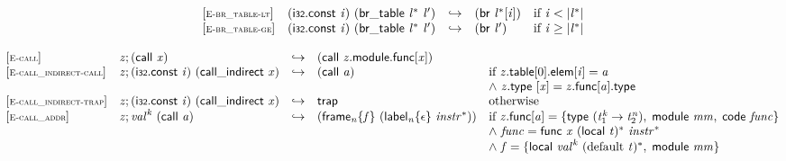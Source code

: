 \vspace{1ex}

$$
\begin{array}{@{}l@{}lcl@{}l@{}}
{[\textsc{\scriptsize E{-}br\_table{-}lt}]} \quad & (\mathsf{i{\scriptstyle32}}.\mathsf{const}~{\mathit{i}})~(\mathsf{br\_table}~{{\mathit{l}}^\ast}~{\mathit{l}'}) &\hookrightarrow& (\mathsf{br}~{{\mathit{l}}^\ast}{}[{\mathit{i}}]) &\quad
  \mbox{if}~{\mathit{i}} < {|{{\mathit{l}}^\ast}|} \\
{[\textsc{\scriptsize E{-}br\_table{-}ge}]} \quad & (\mathsf{i{\scriptstyle32}}.\mathsf{const}~{\mathit{i}})~(\mathsf{br\_table}~{{\mathit{l}}^\ast}~{\mathit{l}'}) &\hookrightarrow& (\mathsf{br}~{\mathit{l}'}) &\quad
  \mbox{if}~{\mathit{i}} \geq {|{{\mathit{l}}^\ast}|} \\
\end{array}
$$

\vspace{1ex}

$$
\begin{array}{@{}l@{}lcl@{}l@{}}
{[\textsc{\scriptsize E{-}call}]} \quad & {\mathit{z}} ; (\mathsf{call}~{\mathit{x}}) &\hookrightarrow& (\mathsf{call}~{\mathit{z}}.\mathsf{module}.\mathsf{func}{}[{\mathit{x}}]) &  \\
{[\textsc{\scriptsize E{-}call\_indirect{-}call}]} \quad & {\mathit{z}} ; (\mathsf{i{\scriptstyle32}}.\mathsf{const}~{\mathit{i}})~(\mathsf{call\_indirect}~{\mathit{x}}) &\hookrightarrow& (\mathsf{call}~{\mathit{a}}) &\quad
  \mbox{if}~{{\mathit{z}}.\mathsf{table}}{{}[0]}.\mathsf{elem}{}[{\mathit{i}}] = {\mathit{a}} \\
 &&&&\quad {\land}~{\mathit{z}}.\mathsf{type}~{}[{\mathit{x}}] = {\mathit{z}}.\mathsf{func}{}[{\mathit{a}}].\mathsf{type} \\
{[\textsc{\scriptsize E{-}call\_indirect{-}trap}]} \quad & {\mathit{z}} ; (\mathsf{i{\scriptstyle32}}.\mathsf{const}~{\mathit{i}})~(\mathsf{call\_indirect}~{\mathit{x}}) &\hookrightarrow& \mathsf{trap} &\quad
  \mbox{otherwise} \\
{[\textsc{\scriptsize E{-}call\_addr}]} \quad & {\mathit{z}} ; {{\mathit{val}}^{{\mathit{k}}}}~(\mathsf{call}~{\mathit{a}}) &\hookrightarrow& ({{\mathsf{frame}}_{{\mathit{n}}}}{\{{\mathit{f}}\}}~({{\mathsf{label}}_{{\mathit{n}}}}{\{\epsilon\}}~{{\mathit{instr}}^\ast})) &\quad
  \mbox{if}~{\mathit{z}}.\mathsf{func}{}[{\mathit{a}}] = \{ \begin{array}[t]{@{}l@{}}
\mathsf{type}~({{\mathit{t}}_{{1}}^{{\mathit{k}}}} \rightarrow {{\mathit{t}}_{{2}}^{{\mathit{n}}}}),\; \mathsf{module}~{\mathit{mm}},\; \mathsf{code}~{\mathit{func}} \}\end{array} \\
 &&&&\quad {\land}~{\mathit{func}} = \mathsf{func}~{\mathit{x}}~{(\mathsf{local}~{\mathit{t}})^\ast}~{{\mathit{instr}}^\ast} \\
 &&&&\quad {\land}~{\mathit{f}} = \{ \begin{array}[t]{@{}l@{}}
\mathsf{local}~{{\mathit{val}}^{{\mathit{k}}}}~{({\mathrm{default}}~{\mathit{t}})^\ast},\; \mathsf{module}~{\mathit{mm}} \}\end{array} \\
\end{array}
$$

